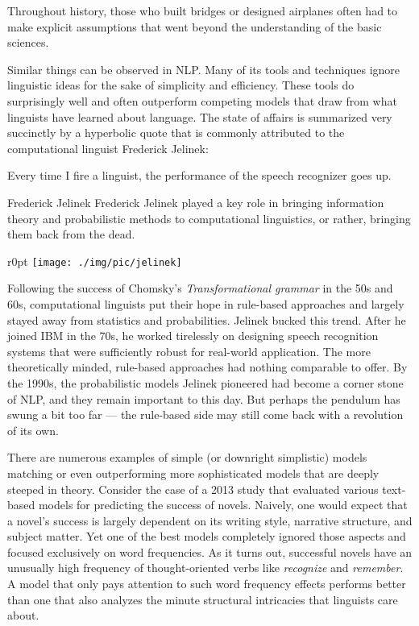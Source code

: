 \begin{fancyquote}
    Throughout history, those who built bridges or designed airplanes often had to make explicit assumptions that went beyond the understanding of the basic sciences.
\end{fancyquote}

Similar things can be observed in NLP\@.
Many of its tools and techniques ignore linguistic ideas for the sake of simplicity and efficiency.
These tools do surprisingly well and often outperform competing models that draw from what linguists have learned about language.
The state of affairs is summarized very succinctly by a hyperbolic quote that is commonly attributed to the computational linguist Frederick Jelinek:

\begin{fancyquote}
    Every time I fire a linguist, the performance of the speech recognizer goes up.
\end{fancyquote}

\begin{person}[1932--2010]{Frederick Jelinek}
Frederick Jelinek played a key role in bringing information theory and probabilistic methods to computational linguistics, or rather, bringing them back from the dead.

\begin{wrapfigure}{r}{0pt}
    \texttt{[image: ./img/pic/jelinek]}
\end{wrapfigure}
Following the success of Chomsky's \emph{Transformational grammar} in the 50s and 60s, computational linguists put their hope in rule-based approaches and largely stayed away from statistics and probabilities.
Jelinek bucked this trend.
After he joined IBM in the 70s, he worked tirelessly on designing speech recognition systems that were sufficiently robust for real-world application.
The more theoretically minded, rule-based approaches had nothing comparable to offer.
By the 1990s, the probabilistic models Jelinek pioneered had become a corner stone of NLP, and they remain important to this day.
But perhaps the pendulum has swung a bit too far --- the rule-based side may still come back with a revolution of its own.
\end{person}

There are numerous examples of simple (or downright simplistic) models matching or even outperforming more sophisticated models that are deeply steeped in theory.
Consider the case of a 2013 study that evaluated various text-based models for predicting the success of novels.
Naively, one would expect that a novel's success is largely dependent on its writing style, narrative structure, and subject matter.
Yet one of the best models completely ignored those aspects and focused exclusively on word frequencies.
As it turns out, successful novels have an unusually high frequency of thought-oriented verbs like \emph{recognize} and \emph{remember}.
A model that only pays attention to such word frequency effects performs better than one that also analyzes the minute structural intricacies that linguists care about.

